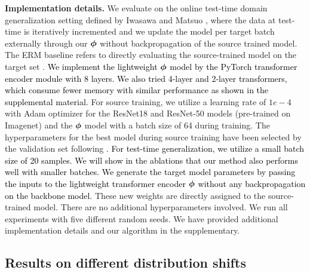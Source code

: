 \vspace{2mm}
\noindent
\textbf{Implementation details.}
We evaluate on the online test-time domain generalization setting defined by Iwasawa and Matsuo \cite{iwasawa2021test}, where the data at test-time is iteratively incremented and we update the model per target batch externally through our $\boldsymbol{\phi}$ without backpropagation of the source trained model. 
The ERM baseline refers to directly evaluating the source-trained model on the target set \cite{gulrajani2020search}. 
\textcolor{black}{We implement the lightweight $\boldsymbol{\phi}$ model by the PyTorch transformer encoder module with 8 layers.
We also tried 4-layer and 2-layer transformers, which consume fewer memory with similar performance as shown in the supplemental material.}
For source training, we utilize a learning rate of $1e-4$ with Adam optimizer for the ResNet18 and ResNet-50 models (pre-trained on Imagenet) and the $\boldsymbol{\phi}$ model with a batch size of 64 during training. The hyperparameters for the best model during source training have been selected by the validation set following \cite{iwasawa2021test,gulrajani2020search}. \textcolor{black}{For test-time generalization, we utilize a small batch size of 20 samples. We will show in the ablations that our method also performs well with smaller batches. We generate the target model parameters by passing the inputs to the lightweight transformer encoder $\boldsymbol{\phi}$ without any backpropagation on the backbone model.} These new weights are directly assigned to the source-trained model. There are no additional hyperparameters involved. We run all experiments with five different random seeds. We have provided additional implementation details and our algorithm in the supplementary.




\subsection{Results on different distribution shifts}


